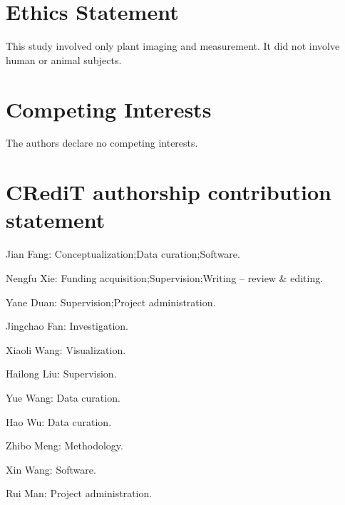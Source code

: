 \documentclass[a4paper]{cas-sc}
\begin{document}
\section*{Ethics Statement}

This study involved only plant imaging and measurement. It did not involve human or animal subjects.

\section*{Competing Interests}

The authors declare no competing interests.

\section*{CRediT authorship contribution statement}

Jian Fang: Conceptualization;Data curation;Software.

Nengfu Xie: Funding acquisition;Supervision;Writing -- review \& editing.

Yane Duan: Supervision;Project administration.

Jingchao Fan: Investigation.

Xiaoli Wang: Visualization.

Hailong Liu: Supervision.

Yue Wang: Data curation.

Hao Wu: Data curation.

Zhibo Meng: Methodology.

Xin Wang: Software.

Rui Man: Project administration.



\end{document}
